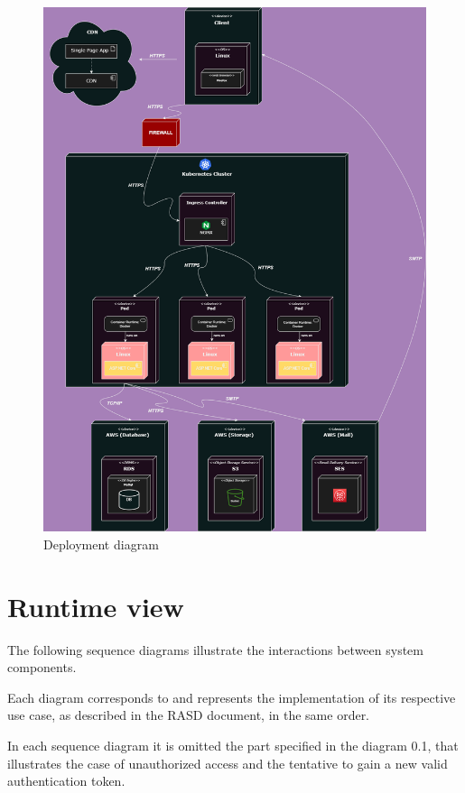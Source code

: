 \begin{figure}[!ht]
    \centering
    \includegraphics[scale=0.30]{Images/ImagesDD/deployment.png}
    \caption{Deployment diagram}
\end{figure}

\newpage


\section{Runtime view}
The following sequence diagrams illustrate the interactions between system components.

Each diagram corresponds to and represents the implementation of its respective use case, as described in the RASD document, in the same order.

In each sequence diagram it is omitted the part specified in the diagram 0.1, that illustrates the case of unauthorized access and the tentative to gain a new valid authentication token.

